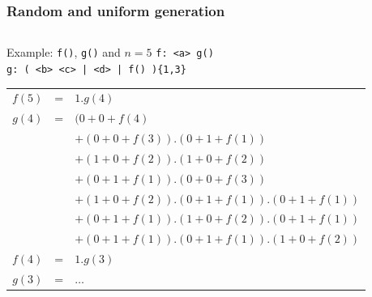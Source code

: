 \documentclass[9pt]{beamer}
\newcommand{\code}[1]{\texttt{#1}}
\begin{document}
\begin{frame}[t]
\frametitle{Random and uniform generation}

\vspace*{-.7cm}

\begin{columns}[t]

\begin{column}{.6\textwidth}
\begin{exampleblock}{Example: \code{f()}, \code{g()} and $n = 5$}
\code{f: <a> g()} \\
\code{g: ( <b> <c> | <d> | f() )\{1,3\}} \\
\vspace{2em}

\begin{overprint}

\scriptsize
\begin{tabular}{rcl}
$f(5)$ & = & $1 . g(4)$ \\
$g(4)$ & = & $(0 + 0 + f(4)$ \\
& & $+ ( 0 + 0 + f(3) ) . ( 0 + 1 + f(1) )$ \\
& & $+ ( 1 + 0 + f(2) ) . ( 1 + 0 + f(2) )$ \\
& & $+ ( 0 + 1 + f(1) ) . ( 0 + 0 + f(3) )$ \\
& & $+ ( 1 + 0 + f(2) ) . ( 0 + 1 + f(1) ) . ( 0 + 1 + f(1) )$ \\
& & $+ ( 0 + 1 + f(1) ) . ( 1 + 0 + f(2) ) . ( 0 + 1 + f(1) )$ \\
& & $+ ( 0 + 1 + f(1) ) . ( 0 + 1 + f(1) ) . ( 1 + 0 + f(2) )$ \\
$f(4)$ & = & $1 . g(3)$ \\
$g(3)$ & = & $…$
\end{tabular}

\end{overprint}
\end{exampleblock}
\end{column}
\end{columns}
\end{frame}
\end{document}
